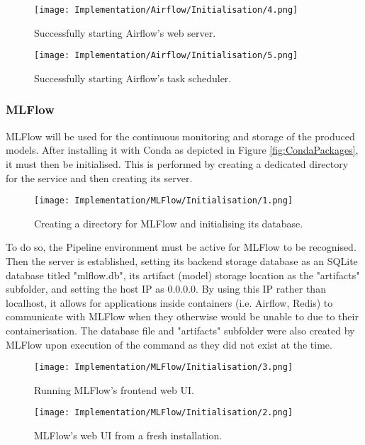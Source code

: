 \begin{figure}[H]
    \centering
    \texttt{[image: Implementation/Airflow/Initialisation/4.png]}
    \caption{Successfully starting Airflow's web server.}
    \label{fig:AirflowWebserver}
\end{figure}

\begin{figure}[H]
    \centering
    \texttt{[image: Implementation/Airflow/Initialisation/5.png]}
    \caption{Successfully starting Airflow's task scheduler.}
    \label{fig:AirflowScheduler}
\end{figure}

\subsubsection{MLFlow}
MLFlow will be used for the continuous monitoring and storage of the produced models. 
After installing it with Conda as depicted in Figure \ref{fig:CondaPackages}, it must then 
be initialised. This is performed by creating a dedicated directory for the service and then 
creating its server.

\begin{figure}[H]
    \centering
    \texttt{[image: Implementation/MLFlow/Initialisation/1.png]}
    \caption{Creating a directory for MLFlow and initialising its database.}
    \label{fig:MLFlowInit}
\end{figure}

\para To do so, the Pipeline environment must be active for MLFlow to be recognised. Then the server 
is established, setting its backend storage database as an SQLite database titled "mlflow.db",
its artifact (model) storage location as the "artifacts" subfolder, and setting the host IP as 0.0.0.0. By using 
this IP rather than localhost, it allows for applications inside containers (i.e. Airflow, Redis) to communicate 
with MLFlow when they otherwise would be unable to due to their containerisation. The database file and "artifacts"
subfolder were also created by MLFlow upon execution of the command as they did not exist at the time. 

\begin{figure}[H]
    \centering
    \texttt{[image: Implementation/MLFlow/Initialisation/3.png]}
    \caption{Running MLFlow's frontend web UI.}
    \label{fig:MLFlowUICmd}
\end{figure}

\begin{figure}[H]
    \centering
    \texttt{[image: Implementation/MLFlow/Initialisation/2.png]}
    \caption{MLFlow's web UI from a fresh installation.}
    \label{fig:MLFlowEmptyUI}
\end{figure}

